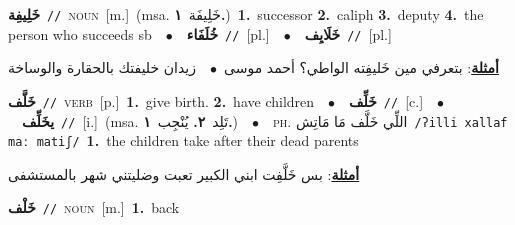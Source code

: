 \documentclass[10pt,a4paper,twoside]{article} %
\begin{document}
\begin{multicols}{2}
{\setlength\topsep{0pt}\textbf{\foreignlanguage{arabic}{خَلِيفِة}}\ {\color{gray}\texttt{//}\color{black}}\ \textsc{noun}\ [m.]\ \color{gray}(msa. \foreignlanguage{arabic}{خَلِيفَة}~\foreignlanguage{arabic}{\textbf{١.}})\color{black}\ \textbf{1.}~successor  \textbf{2.}~caliph  \textbf{3.}~deputy  \textbf{4.}~the person who succeeds sb\ \ $\bullet$\ \ \setlength\topsep{0pt}\textbf{\foreignlanguage{arabic}{خُلَفَاء}}\ {\color{gray}\texttt{//}\color{black}}\ [pl.]\ \ $\bullet$\ \ \setlength\topsep{0pt}\textbf{\foreignlanguage{arabic}{خَلَايِف}}\ {\color{gray}\texttt{//}\color{black}}\ [pl.]\  \begin{flushright}\color{gray}\foreignlanguage{arabic}{\textbf{\underline{\foreignlanguage{arabic}{أمثلة}}}: بتعرفي مين خَليفِته الواطي؟ أحمد موسى\ $\bullet$\ \  زيدان خليفتك بالحقارة والوساخة}\end{flushright}\color{black}} \vspace{2mm}

{\setlength\topsep{0pt}\textbf{\foreignlanguage{arabic}{خَلَّف}}\ {\color{gray}\texttt{//}\color{black}}\ \textsc{verb}\ [p.]\ \textbf{1.}~give birth.  \textbf{2.}~have children\ \ $\bullet$\ \ \setlength\topsep{0pt}\textbf{\foreignlanguage{arabic}{خَلِّف}}\ {\color{gray}\texttt{//}\color{black}}\ [c.]\ \ $\bullet$\ \ \setlength\topsep{0pt}\textbf{\foreignlanguage{arabic}{يخَلِّف}}\ {\color{gray}\texttt{//}\color{black}}\ [i.]\ \color{gray}(msa. \foreignlanguage{arabic}{تَلِد}~\foreignlanguage{arabic}{\textbf{٢.}}  \foreignlanguage{arabic}{يُنْجِب}~\foreignlanguage{arabic}{\textbf{١.}})\color{black}\ \ $\bullet$\ \ \textsc{ph.} \color{gray} \foreignlanguage{arabic}{اللِّي خَلَّف مَا مَاتِش}\color{black}\ {\color{gray}\texttt{/{\sffamily ʔilli xallaf maː matiʃ}/}\color{black}}\ \textbf{1.}~the children take after their dead parents\  \begin{flushright}\color{gray}\foreignlanguage{arabic}{\textbf{\underline{\foreignlanguage{arabic}{أمثلة}}}: بس خَلَّفِت ابني الكبير تعبت وضليتني شهر بالمستشفى}\end{flushright}\color{black}} \vspace{2mm}

{\setlength\topsep{0pt}\textbf{\foreignlanguage{arabic}{خَلْف}}\ {\color{gray}\texttt{//}\color{black}}\ \textsc{noun}\ [m.]\ \textbf{1.}~back\ } \vspace{2mm}


\end{multicols}
\end{document}
